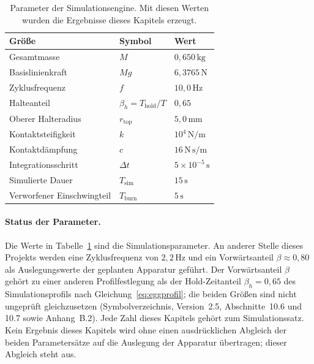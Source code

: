 \documentclass[12pt,a4paper]{report}
\begin{document}
\begin{table}[htbp]
  \centering
  \begin{tabular}{lll}
    \hline
    Größe & Symbol & Wert \\
    \hline
    Gesamtmasse             & $M$              & $0{,}650\,\mathrm{kg}$ \\
    Basislinienkraft        & $Mg$             & $6{,}3765\,\mathrm{N}$ \\
    Zyklusfrequenz          & $f$              & $10{,}0\,\mathrm{Hz}$ \\
    Halteanteil             & $\beta_h = T_{\mathrm{hold}}/T$ & $0{,}65$ \\
    Oberer Halteradius      & $r_{\mathrm{top}}$ & $5{,}0\,\mathrm{mm}$ \\
    Kontaktsteifigkeit      & $k$              & $10^{4}\,\mathrm{N/m}$ \\
    Kontaktdämpfung         & $c$              & $16\,\mathrm{N\,s/m}$ \\
    Integrationsschritt     & $\Delta t$       & $5\times10^{-5}\,\mathrm{s}$ \\
    Simulierte Dauer        & $T_{\mathrm{sim}}$ & $15\,\mathrm{s}$ \\
    Verworfener Einschwingteil & $T_{\mathrm{burn}}$ & $5\,\mathrm{s}$ \\
    \hline
  \end{tabular}
  \caption{Parameter der Simulationsengine. Mit diesen Werten wurden die
  Ergebnisse dieses Kapitels erzeugt.}
  \label{tab:sim-params}
\end{table}

\paragraph{Status der Parameter.}
Die Werte in Tabelle~\ref{tab:sim-params} sind die Simulationsparameter.
An anderer Stelle dieses Projekts werden eine Zyklusfrequenz von
$2{,}2\,\mathrm{Hz}$ und ein Vorwärtsanteil $\beta \approx 0{,}80$ als
Auslegungswerte der geplanten Apparatur geführt. Der Vorwärtsanteil
$\beta$ gehört zu einer anderen Profilfestlegung als der Hold-Zeitanteil
$\beta_h = 0{,}65$ des Simulationsprofils nach
Gleichung~\eqref{eq:eggprofil}; die beiden Größen sind nicht ungeprüft
gleichzusetzen (Symbolverzeichnis, Version~2.5, Abschnitte~10.6 und 10.7
sowie Anhang~B.2). Jede Zahl dieses Kapitels gehört
zum Simulationssatz. Kein Ergebnis dieses Kapitels wird ohne einen
ausdrücklichen Abgleich der beiden Parametersätze auf die Auslegung der
Apparatur übertragen; dieser Abgleich steht aus.
\end{document}
